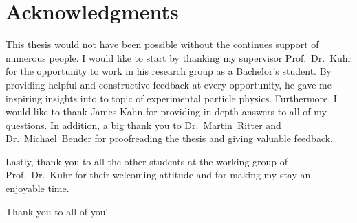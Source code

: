 \thispagestyle{empty}
\chapter*{Acknowledgments}

This thesis would not have been possible without the continues support of numerous people. I would like to start by thanking my supervisor Prof.~Dr.~Kuhr for the opportunity to work in his research group as a Bachelor's student. By providing helpful and constructive feedback at every opportunity, he gave me inspiring insights into to topic of experimental particle physics. Furthermore, I would like to thank James Kahn for providing in depth answers to all of my questions.
In addition, a big thank you to Dr.~Martin~Ritter and Dr.~Michael~Bender for proofreading the thesis and giving valuable feedback.

Lastly, thank you to all the other students at the working group of Prof.~Dr.~Kuhr for their welcoming attitude and for making my stay an enjoyable time.

Thank you to all of you!
